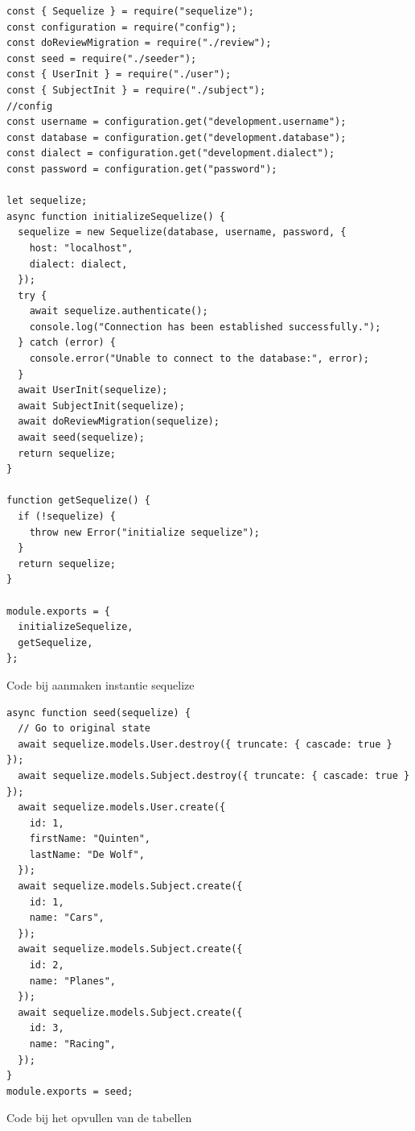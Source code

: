 \begin{listing}[H]
  \centering
  \begin{verbatim}
const { Sequelize } = require("sequelize");
const configuration = require("config");
const doReviewMigration = require("./review");
const seed = require("./seeder");
const { UserInit } = require("./user");
const { SubjectInit } = require("./subject");
//config
const username = configuration.get("development.username");
const database = configuration.get("development.database");
const dialect = configuration.get("development.dialect");
const password = configuration.get("password");

let sequelize;
async function initializeSequelize() {
  sequelize = new Sequelize(database, username, password, {
    host: "localhost",
    dialect: dialect,
  });
  try {
    await sequelize.authenticate();
    console.log("Connection has been established successfully.");
  } catch (error) {
    console.error("Unable to connect to the database:", error);
  }
  await UserInit(sequelize);
  await SubjectInit(sequelize);
  await doReviewMigration(sequelize);
  await seed(sequelize);
  return sequelize;
}

function getSequelize() {
  if (!sequelize) {
    throw new Error("initialize sequelize");
  }
  return sequelize;
}

module.exports = {
  initializeSequelize,
  getSequelize,
};
\end{verbatim}
\caption{\label{code:Instantie}Code bij aanmaken instantie sequelize}
\end{listing}

\begin{listing}[H]
  \centering
  \begin{verbatim}
async function seed(sequelize) {
  // Go to original state
  await sequelize.models.User.destroy({ truncate: { cascade: true } });
  await sequelize.models.Subject.destroy({ truncate: { cascade: true } });
  await sequelize.models.User.create({
    id: 1,
    firstName: "Quinten",
    lastName: "De Wolf",
  });
  await sequelize.models.Subject.create({
    id: 1,
    name: "Cars",
  });
  await sequelize.models.Subject.create({
    id: 2,
    name: "Planes",
  });
  await sequelize.models.Subject.create({
    id: 3,
    name: "Racing",
  });
}
module.exports = seed;
\end{verbatim}
\caption{\label{code:Seed}Code bij het opvullen van de tabellen}
\end{listing}

